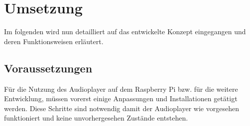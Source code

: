 
\chapter{Umsetzung}

Im folgenden wird nun detailliert auf das entwickelte Konzept eingegangen und deren Funktionsweisen erläutert.


\section{Voraussetzungen}
Für die Nutzung des Audioplayer auf dem Raspberry Pi bzw. für die weitere Entwicklung, müssen vorerst einige Anpassungen und Installationen getätigt werden. Diese Schritte sind notwendig damit der Audioplayer wie vorgesehen funktioniert und keine unvorhergesehen Zustände entstehen.

